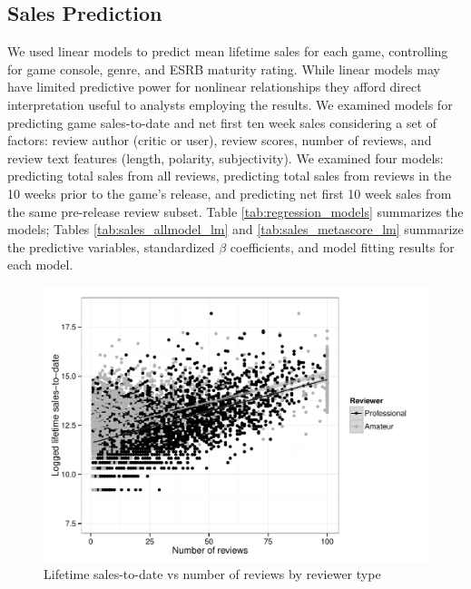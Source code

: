 \documentclass[letterpaper]{article}
\begin{document}
\subsection{Sales Prediction}
We used linear models to predict mean lifetime sales for each game, controlling for game console, genre, and ESRB maturity rating. While linear models may have limited predictive power for nonlinear relationships they afford direct interpretation useful to analysts employing the results. We examined models for predicting game sales-to-date and net first ten week sales considering a set of factors: review author (critic or user), review scores, number of reviews, and review text features (length, polarity, subjectivity). We examined four models: predicting total sales from all reviews, predicting total sales from reviews in the 10 weeks prior to the game's release, and predicting net first 10 week sales from the same pre-release review subset. Table \ref{tab:regression_models} summarizes the models; Tables \ref{tab:sales_allmodel_lm} and \ref{tab:sales_metascore_lm} summarize the predictive variables, standardized $\beta$ coefficients, and model fitting results for each model.

\begin{figure}[tbp]
\centering
\includegraphics[width=\linewidth]{./sales_numscore_total}
\caption{Lifetime sales-to-date vs number of reviews by reviewer type}
\label{fig:lifesale_revnum}
\end{figure}
\end{document}
